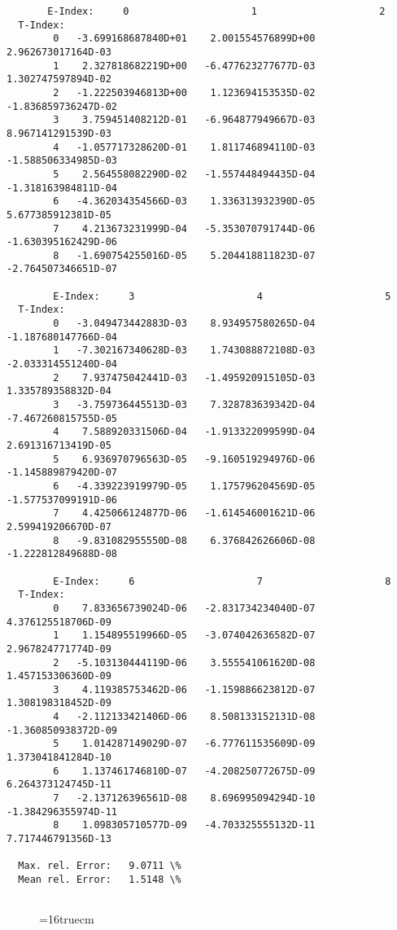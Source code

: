 \documentclass[12pt,dvipdfmx]{article}
\begin{document}
\begin{small}\begin{verbatim}
       E-Index:     0                     1                     2
  T-Index:
        0   -3.699168687840D+01    2.001554576899D+00    2.962673017164D-03
        1    2.327818682219D+00   -6.477623277677D-03    1.302747597894D-02
        2   -1.222503946813D+00    1.123694153535D-02   -1.836859736247D-02
        3    3.759451408212D-01   -6.964877949667D-03    8.967141291539D-03
        4   -1.057717328620D-01    1.811746894110D-03   -1.588506334985D-03
        5    2.564558082290D-02   -1.557448494435D-04   -1.318163984811D-04
        6   -4.362034354566D-03    1.336313932390D-05    5.677385912381D-05
        7    4.213673231999D-04   -5.353070791744D-06   -1.630395162429D-06
        8   -1.690754255016D-05    5.204418811823D-07   -2.764507346651D-07

        E-Index:     3                     4                     5
  T-Index:
        0   -3.049473442883D-03    8.934957580265D-04   -1.187680147766D-04
        1   -7.302167340628D-03    1.743088872108D-03   -2.033314551240D-04
        2    7.937475042441D-03   -1.495920915105D-03    1.335789358832D-04
        3   -3.759736445513D-03    7.328783639342D-04   -7.467260815755D-05
        4    7.588920331506D-04   -1.913322099599D-04    2.691316713419D-05
        5    6.936970796563D-05   -9.160519294976D-06   -1.145889879420D-07
        6   -4.339223919979D-05    1.175796204569D-05   -1.577537099191D-06
        7    4.425066124877D-06   -1.614546001621D-06    2.599419206670D-07
        8   -9.831082955550D-08    6.376842626606D-08   -1.222812849688D-08

        E-Index:     6                     7                     8
  T-Index:
        0    7.833656739024D-06   -2.831734234040D-07    4.376125518706D-09
        1    1.154895519966D-05   -3.074042636582D-07    2.967824771774D-09
        2   -5.103130444119D-06    3.555541061620D-08    1.457153306360D-09
        3    4.119385753462D-06   -1.159886623812D-07    1.308198318452D-09
        4   -2.112133421406D-06    8.508133152131D-08   -1.360850938372D-09
        5    1.014287149029D-07   -6.777611535609D-09    1.373041841284D-10
        6    1.137461746810D-07   -4.208250772675D-09    6.264373124745D-11
        7   -2.137126396561D-08    8.696995094294D-10   -1.384296355974D-11
        8    1.098305710577D-09   -4.703325555132D-11    7.717446791356D-13

  Max. rel. Error:   9.0711 \%
  Mean rel. Error:   1.5148 \%


\end{verbatim}\end{small}
\begin{figure} \label{2.2.15c}
\epsfxsize=16truecm
\end{figure}
\newpage
\end{document}
